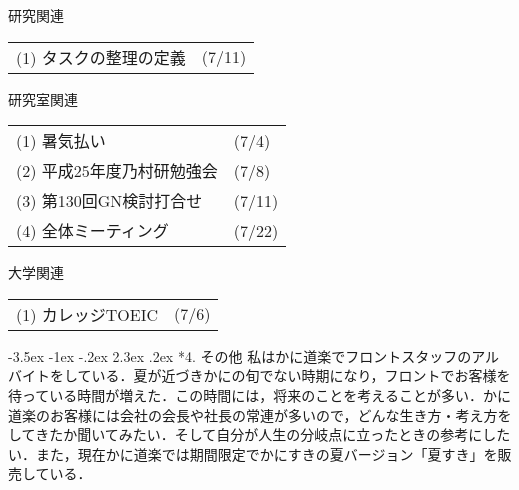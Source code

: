 \documentclass[fleqn, 14pt]{extarticlej}
\makeatletter
\def\section{\@startsection {section}{1}{\z@}%
{-3.5ex \@plus -1ex \@minus -.2ex}%
{2.3ex \@plus.2ex}%
{\sectionformat}}
\def\sectionformat{\normalsize}
\makeatother
\begin{document}
\vspace{-0.5em}
\begin{description}
\vspace{-0.5em}
\item[　3.1] 研究関連

  \begin{tabular}{p{11.8cm}l}
	(1) タスクの整理の定義&(7/11)\\
    
  \end{tabular}
\vspace{-0.5em}
\item[　3.2] 研究室関連

  \begin{tabular}{p{11.8cm}l}
    (1) 暑気払い&(7/4)\\
    (2) 平成25年度乃村研勉強会&(7/8)\\
    (3) 第130回GN検討打合せ&(7/11)\\
    (4) 全体ミーティング&(7/22)\\
  \end{tabular}
\vspace{-0.5em}
\item[　3.3] 大学関連

  \begin{tabular}{p{11.8cm}l}
   (1) カレッジTOEIC&(7/6)\\

  \end{tabular}

\end{description}

\vspace{-0.5em}
\section*{4. その他}
私はかに道楽でフロントスタッフのアルバイトをしている．夏が近づきかにの旬でない時期になり，フロントでお客様を待っている時間が増えた．この時間には，将来のことを考えることが多い．かに道楽のお客様には会社の会長や社長の常連が多いので，どんな生き方・考え方をしてきたか聞いてみたい．そして自分が人生の分岐点に立ったときの参考にしたい．また，現在かに道楽では期間限定でかにすきの夏バージョン「夏すき」を販売している．
\end{document}
